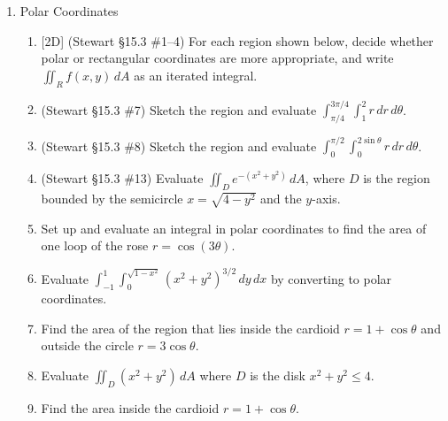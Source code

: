 \documentclass[12pt]{article}
\newcommand{\dimtag}[1]{{\footnotesize\textsc{[#1]}}\;}
\begin{document}
\begin{enumerate}
\item Polar Coordinates
    \begin{enumerate}
        \item \dimtag{2D} (Stewart \S15.3 \#1--4) For each region shown below, decide whether polar or rectangular coordinates are more appropriate, and write $\iint_R f(x,y)\,dA$ as an iterated integral.
        \begin{center}
        \quad
        \quad
        \end{center}
        \item (Stewart \S15.3 \#7) Sketch the region and evaluate $\displaystyle\int_{\pi/4}^{3\pi/4}\int_1^2 r\,dr\,d\theta$.
        \item (Stewart \S15.3 \#8) Sketch the region and evaluate $\displaystyle\int_0^{\pi/2}\int_0^{2\sin\theta} r\,dr\,d\theta$.
        \item (Stewart \S15.3 \#13) Evaluate $\iint_D e^{-(x^2+y^2)}\,dA$, where $D$ is the region bounded by the semicircle $x = \sqrt{4-y^2}$ and the $y$-axis.
        \item Set up and evaluate an integral in polar coordinates to find the area of one loop of the rose $r = \cos(3\theta)$.
        \item Evaluate $\int_{-1}^{1} \int_{0}^{\sqrt{1-x^2}} (x^2 + y^2)^{3/2} \, dy \, dx$ by converting to polar coordinates.
        \item  Find the area of the region that lies inside the cardioid $r = 1 + \cos \theta$ and outside the circle $r = 3\cos \theta$.
        \item Evaluate $\iint_D (x^2+y^2)\,dA$ where $D$ is the disk $x^2+y^2\le 4$.
        \item Find the area inside the cardioid $r=1+\cos\theta$.
    \end{enumerate}
\newpage


\end{enumerate}
\end{document}
